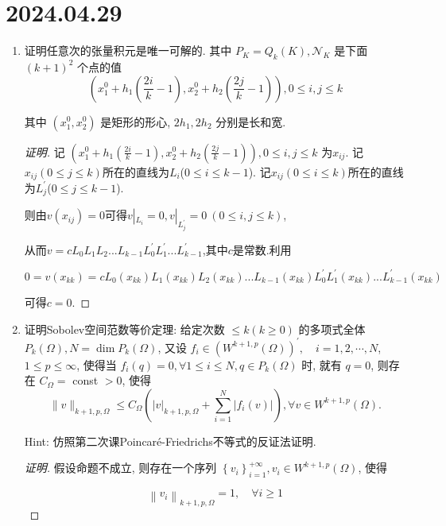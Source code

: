 \documentclass[12pt,a4paper]{article}
\begin{document}
	
	\noindent
	
	\section*{2024.04.29}	
	
	\begin{enumerate}
		\item 证明任意次的张量积元是唯一可解的. 其中 $P_K=Q_k(K), \mathcal{N}_K$ 是下面 $(k+1)^2$ 个点的值
		$$
		\left(x_1^0+h_1\left(\frac{2 i}{k}-1\right), x_2^0+h_2\left(\frac{2 j}{k}-1\right)\right), 0 \leq i, j \leq k
		$$
		
		其中 $\left(x_1^0, x_2^0\right)$ 是矩形的形心, $2 h_1, 2 h_2$ 分别是长和宽.
		
		\begin{proof}[证明]
			记 $	\left(x_1^0+h_1\left(\frac{2 i}{k}-1\right), x_2^0+h_2\left(\frac{2 j}{k}-1\right)\right),0 \leq i, j \leq k$
			为$x_{ij}$. 记$x_{ij}(0 \leq j \leq k)$所在的直线为$L_i$($0 \leq i \leq k-1$). 记$x_{ij}(0 \leq i \leq k)$所在的直线为$L^\prime_j$($0 \leq j \leq k-1$). 
			
			则由$v(x_{ij})=0$可得$v|_{L_i}=0,v|_{L^\prime_j}=0 \ (0 \leq i, j \leq k)$,
			
			从而$v=cL_0L_1 L_2...L_{k-1} L^\prime_0 L^\prime_1...L^\prime_{k-1}$,其中$c$是常数.利用
			
			$$
			0 = v(x_{kk})=cL_0(x_{kk})L_1(x_{kk}) L_2(x_{kk})...L_{k-1}(x_{kk}) L^\prime_0 L^\prime_1(x_{kk})...L^\prime_{k-1}(x_{kk})
			$$
			
			可得$c = 0$.
		\end{proof}
		
		\item 证明Sobolev空间范数等价定理: 给定次数 $\leq k(k \geq 0)$ 的多项式全体 $P_k(\Omega), N=\operatorname{dim} P_k(\Omega)$, 又设 $f_i \in\left(W^{k+1, p}(\Omega)\right)^{\prime}, \quad i=1,2, \cdots, N$, $1 \leq p \leq \infty$, 使得当 $f_i(q)=0, \forall 1 \leq i \leq N, q \in P_k(\Omega)$ 时, 就有 $q=0$, 则存在 $C_{\Omega}=$ const $>0$, 使得
		$$
		\|v\|_{k+1, p, \Omega} \leq C_{\Omega}\left(|v|_{k+1, p, \Omega}+\sum_{i=1}^N\left|f_i(v)\right|\right), \forall v \in W^{k+1, p}(\Omega) .
		$$
		
		Hint: 仿照第二次课Poincaré-Friedrichs不等式的反证法证明.
		
		\begin{proof}[证明]
			假设命题不成立, 则存在一个序列 $\left\{v_i\right\}_{i=1}^{+\infty}, v_i \in W^{k+1, p}(\Omega)$, 使得
			
			\begin{equation}
					\left\|v_i\right\|_{k+1, p, \Omega}=1, \quad \forall i \geqslant 1 \label{norm}
			\end{equation}
			

\end{proof}
\end{enumerate}
\end{document}
